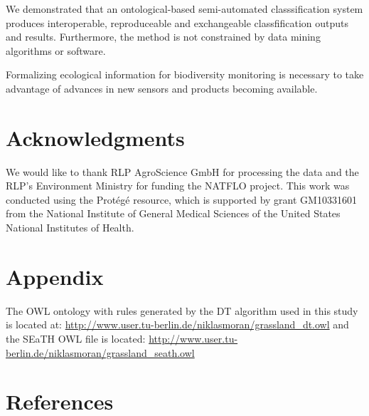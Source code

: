 \documentclass[authoryear,preprint,12pt,number]{elsarticle}
\begin{document}
We demonstrated that an ontological-based semi-automated classsification system
produces interoperable, reproduceable and exchangeable classfification outputs
and results. Furthermore, the method is not constrained by data mining
algorithms or software.  

Formalizing ecological information for biodiversity monitoring is
necessary to take advantage of advances in new sensors and products becoming
available. 
\section{Acknowledgments}
We would like to thank RLP AgroScience GmbH for processing the data and the 
RLP's Environment Ministry for funding the NATFLO project. This work was 
conducted using the Prot\'eg\'e resource, which is supported by grant 
GM10331601 from the National Institute of General Medical Sciences of the 
United States National Institutes of Health.
\section{Appendix}
The OWL ontology with rules generated by the DT algorithm used in this study is
located at: \url{http://www.user.tu-berlin.de/niklasmoran/grassland_dt.owl} and
the SEaTH OWL file is located:
\url{http://www.user.tu-berlin.de/niklasmoran/grassland_seath.owl}

\section{References}

\end{document}
